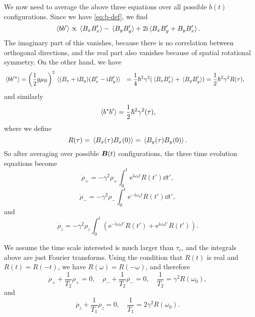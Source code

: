 \documentclass[hyperref, a4paper]{article}
\newcommand*{\ii}{\mathrm{i}}
\newcommand*{\ee}{\mathrm{e}}
\def\\{}%
\newcommand*{\muB}{\mu_{\text{B}}}
\begin{document}
We now need to average the above three equations 
over all possible $b(t)$ configurations. 
Since we have \eqref{eq:b-def},
we find 
\[
    \expval*{b b'} \propto \expval*{B_x B_x'} - \expval*{B_y B_y'} + 2 \ii \expval*{B_x B_y' + B_y B_x'}.
\]
The imaginary part of this vanishes, 
because there is no correlation between orthogonal directions, 
and the real part also vanishes 
because of spatial rotational symmetry.
On the other hand, we have
\begin{equation}
    \begin{aligned}
        \expval*{b b'^*} &= \left(\frac{1}{2} g \muB\right)^2 \expval*{ (B_x + \ii B_y) (B_x' - \ii B_y') } \\
        &= \frac{1}{4} \hbar^2 \gamma^2 ( \expval*{B_x B_x'} + \expval*{B_y B_y'} ) \\
        &= \frac{1}{2} \hbar^2 \gamma^2 R(\tau),
    \end{aligned}
\end{equation} 
and similarly 
\begin{equation}
    \expval*{b^* b'} = \frac{1}{2} \hbar^2 \gamma^2 (\tau),
\end{equation}
where we define 
\begin{equation}
    R(\tau) = \expval*{B_x(\tau) B_x(0)} = \expval*{B_y(\tau) B_y(0)}.
\end{equation}
So after averaging over possible $\vb*{B}(t)$ configurations, 
the three time evolution equations become 
\begin{equation}
    \dot{\rho}_+ = - \gamma^2 \rho_+ \int_{0}^{t} \ee^{\ii \omega_0 t} R(t') \dd{t'},
\end{equation}
\begin{equation}
    \dot{\rho}_- = - \gamma^2 \rho_- \int_{0}^{t} \ee^{- \ii \omega_0 t} R(t') \dd{t'},   
\end{equation}
and 
\begin{equation}
    \dot{\rho}_z = - \gamma^2 \rho_z \int_{0}^{t} (
        \ee^{- \ii \omega_0 t'} R(t') + \ee^{\ii \omega_0 t'} R(t')
    ).
\end{equation}

We assume the time scale interested is much larger than $\tau_{\text{c}}$, 
and the integrals above are just Fourier transforms.
Using the condition that $R(t)$ is real and $R(t) = R(-t)$, 
we have $R(\omega) = R(- \omega)$, 
and therefore 
\begin{equation}
    \dot{\rho}_+ + \frac{1}{T_2} \rho_+ = 0, \quad 
    \dot{\rho}_- + \frac{1}{T_2} \rho_- = 0, \quad 
    \frac{1}{T_2} = \gamma^2 R(\omega_0),
\end{equation}
and 
\begin{equation}
    \dot{\rho}_z + \frac{1}{T_1} \rho_z = 0, \quad 
    \frac{1}{T_1} = 2 \gamma^2 R(\omega_0).
\end{equation}
\end{document}
